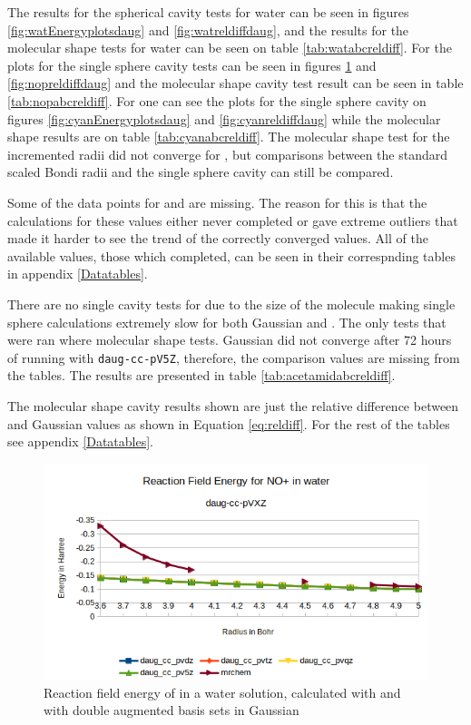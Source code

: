 \documentclass[../master_thesis.tex]{subfiles}
\begin{document}
The results for the spherical cavity tests for water can be seen in figures
\ref{fig:watEnergyplotsdaug} and \ref{fig:watreldiffdaug}, and the results for the
molecular shape tests for water can be seen on table \ref{tab:watabcreldiff}.
For  the plots for the single sphere cavity tests can be seen in figures
\ref{fig:nopEnergyplotsdaug} and \ref{fig:nopreldiffdaug} and the molecular
shape cavity test result can be seen in table \ref{tab:nopabcreldiff}.
For  one can see the plots for the single sphere cavity on figures
\ref{fig:cyanEnergyplotsdaug} and \ref{fig:cyanreldiffdaug} while the
molecular shape results are on table \ref{tab:cyanabcreldiff}. The molecular shape
test for the incremented radii did not converge for , but comparisons between
the standard scaled Bondi radii and the single sphere cavity can still be compared.

Some of the data points for  and  are missing. The reason for this
is that the calculations for these values either never completed or gave extreme
outliers that made it harder to see the trend of the correctly converged values.
All of the available values, those which completed, can be seen in their correspnding
tables in appendix \ref{Datatables}.

There are no single cavity tests for  due to the size of the molecule
making single sphere calculations extremely slow for both Gaussian and \mrchem.
The only tests that were ran where molecular shape tests. Gaussian did not converge
after 72 hours of running with \verb!daug-cc-pV5Z!, therefore, the comparison values
are missing from the tables. The  results are presented in table
\ref{tab:acetamidabcreldiff}.

The molecular shape cavity results shown are just the relative difference between
\mrchem and Gaussian values as shown in Equation \ref{eq:reldiff}. For the rest of the
tables see appendix \ref{Datatables}.

\begin{figure}[!htb]
  \centering
    \includegraphics[width=\linewidth]{img/Erdaugnop.png}
  \caption[Energy plots for ]{Reaction field energy of  in a water solution, calculated with \mrchem
  and with double augmented basis sets in Gaussian}
  \label{fig:nopEnergyplotsdaug}
\end{figure}
\end{document}
